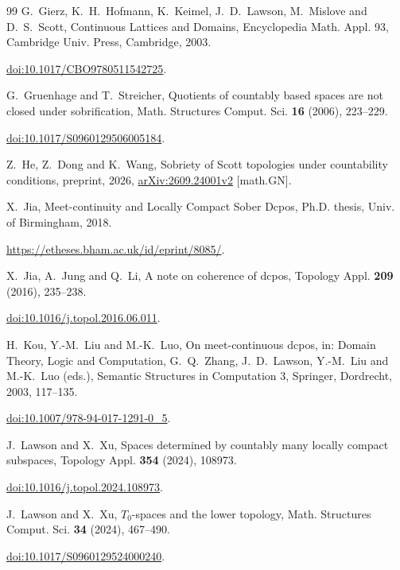 \documentclass[10pt,a4paper]{article}
\theoremstyle{definition}
\begin{document}
\begin{thebibliography}{99}
G.~Gierz, K.~H.~Hofmann, K.~Keimel, J.~D.~Lawson, M.~Mislove and D.~S.~Scott,
Continuous Lattices and Domains, Encyclopedia Math. Appl. 93,
Cambridge Univ. Press, Cambridge, 2003.
\newblock\par\nobreak\noindent\href{https://doi.org/10.1017/CBO9780511542725}{doi:10.1017/CBO9780511542725}.

G.~Gruenhage and T.~Streicher,
Quotients of countably based spaces are not closed under sobrification,
Math. Structures Comput. Sci. \textbf{16} (2006), 223--229.
\newblock\par\nobreak\noindent\href{https://doi.org/10.1017/S0960129506005184}{doi:10.1017/S0960129506005184}.

Z.~He, Z.~Dong and K.~Wang,
Sobriety of Scott topologies under countability conditions,
preprint, 2026, \href{https://arxiv.org/abs/2609.24001v2}{arXiv:2609.24001v2} [math.GN].

X.~Jia, Meet-continuity and Locally Compact Sober Dcpos,
Ph.D. thesis, Univ. of Birmingham, 2018.
\newblock\par\nobreak\noindent\url{https://etheses.bham.ac.uk/id/eprint/8085/}.

X.~Jia, A.~Jung and Q.~Li, A note on coherence of dcpos,
Topology Appl. \textbf{209} (2016), 235--238.
\newblock\par\nobreak\noindent\href{https://doi.org/10.1016/j.topol.2016.06.011}{doi:10.1016/j.topol.2016.06.011}.

H.~Kou, Y.-M.~Liu and M.-K.~Luo, On meet-continuous dcpos,
in: Domain Theory, Logic and Computation,
G.~Q.~Zhang, J.~D.~Lawson, Y.-M.~Liu and M.-K.~Luo (eds.),
Semantic Structures in Computation 3, Springer, Dordrecht, 2003, 117--135.
\newblock\par\nobreak\noindent\href{https://doi.org/10.1007/978-94-017-1291-0_5}{doi:10.1007/978-94-017-1291-0\_5}.

J.~Lawson and X.~Xu,
Spaces determined by countably many locally compact subspaces,
Topology Appl. \textbf{354} (2024), 108973.
\newblock\par\nobreak\noindent\href{https://doi.org/10.1016/j.topol.2024.108973}{doi:10.1016/j.topol.2024.108973}.

J.~Lawson and X.~Xu, $T_0$-spaces and the lower topology,
Math. Structures Comput. Sci. \textbf{34} (2024), 467--490.
\newblock\par\nobreak\noindent\href{https://doi.org/10.1017/S0960129524000240}{doi:10.1017/S0960129524000240}.


\end{thebibliography}
\end{document}
